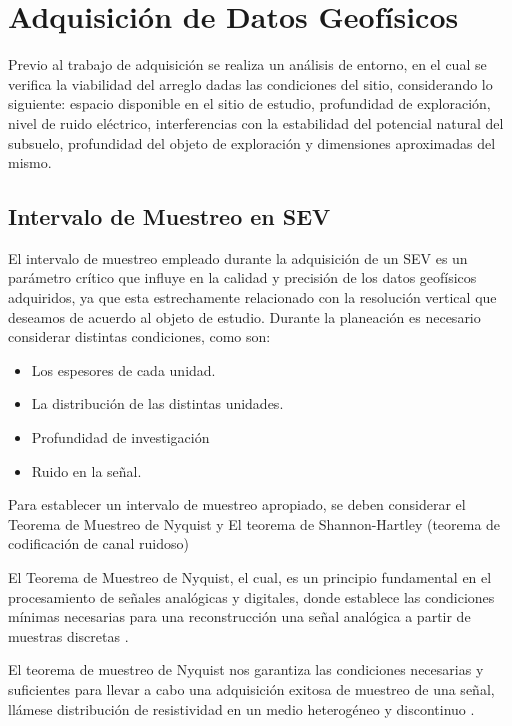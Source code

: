 	\section{Adquisición de Datos Geofísicos}
	
	Previo al trabajo de adquisición se realiza un análisis de entorno, en el cual se verifica la viabilidad del arreglo dadas las condiciones del sitio, considerando lo siguiente: espacio disponible en el sitio de estudio, profundidad de exploración, nivel de ruido eléctrico, interferencias con la estabilidad del potencial natural del subsuelo, profundidad del objeto de exploración y dimensiones aproximadas del mismo.
	
		\subsection{Intervalo de Muestreo en SEV}
			
			El intervalo de muestreo empleado durante la adquisición de un SEV es un parámetro crítico que influye en la calidad y precisión de los datos geofísicos adquiridos, ya que esta estrechamente relacionado con la resolución vertical que deseamos de acuerdo al objeto de estudio. Durante la planeación es necesario considerar distintas condiciones, como son:
			
			\begin{itemize}
				\item Los espesores de cada unidad.
				\item La distribución de las distintas unidades.
				\item Profundidad de investigación
				\item Ruido en la señal.
			\end{itemize}
			
			Para establecer un intervalo de muestreo apropiado, se deben considerar el Teorema de Muestreo de Nyquist y El teorema de Shannon-Hartley (teorema de codificación de canal ruidoso)
			
			El Teorema de Muestreo de Nyquist, el cual, es un principio fundamental en el procesamiento de señales analógicas y digitales, donde establece las condiciones mínimas necesarias para una reconstrucción una señal analógica a partir de muestras discretas \citep{alvarado2010}.
			
			El teorema de muestreo de Nyquist nos garantiza las condiciones necesarias y suficientes para llevar a cabo una adquisición exitosa de muestreo de una señal, llámese distribución de resistividad en un medio heterogéneo y discontinuo \citep{alvarado2010}.
			
